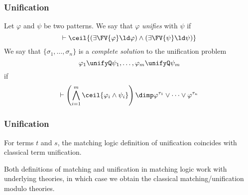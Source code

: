 \begin{frame}
\frametitle{Unification}

\begin{definition}
\label{def:unification}
Let $\varphi$ and $\psi$ be two patterns. We say that $\varphi$ \emph{unifies}
with $\psi$ if
\[\vdash \ceil{\left(\exists \FV{\varphi} \ld \varphi\right)
  \land \left(\exists \FV{\psi} \ld \psi\right)}\]
We say that $\{\sigma_1,\dots,\sigma_n\}$ is a \emph{complete solution}
to the unification problem
\[\varphi_1 \unifyQ \psi_1, \dots, \varphi_m \unifyQ \psi_m\]
if
\[\vdash \left(\bigwedge_{i=1}^m \ceil{\varphi_i \land \psi_i}\right)
  \dimp \varphi^{\tau_1} \lor \dots \lor \varphi^{\tau_n}
\]
\end{definition}
\end{frame}

\begin{frame}
\frametitle{Unification}

\begin{lemma}
For terms $t$ and $s$,
the matching logic definition of
unification coincides with classical term unification.
\end{lemma}

Both definitions of matching and unification
in matching logic
work with underlying theories, 
in which case we obtain the classical
matching/unification modulo theories.
\end{frame}


